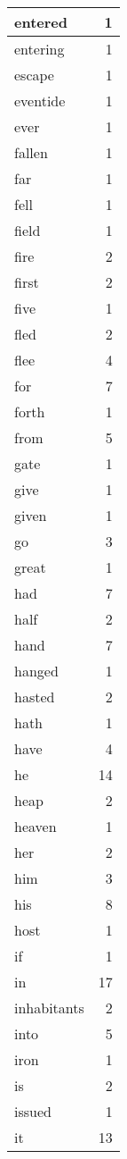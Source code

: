 \begin{center}
\begin{longtable}{l|r}
entered & 1\\ \hline 
entering & 1\\ \hline 
escape & 1\\ \hline 
eventide & 1\\ \hline 
ever & 1\\ \hline 
fallen & 1\\ \hline 
far & 1\\ \hline 
fell & 1\\ \hline 
field & 1\\ \hline 
fire & 2\\ \hline 
first & 2\\ \hline 
five & 1\\ \hline 
fled & 2\\ \hline 
flee & 4\\ \hline 
for & 7\\ \hline 
forth & 1\\ \hline 
from & 5\\ \hline 
gate & 1\\ \hline 
give & 1\\ \hline 
given & 1\\ \hline 
go & 3\\ \hline 
great & 1\\ \hline 
had & 7\\ \hline 
half & 2\\ \hline 
hand & 7\\ \hline 
hanged & 1\\ \hline 
hasted & 2\\ \hline 
hath & 1\\ \hline 
have & 4\\ \hline 
he & 14\\ \hline 
heap & 2\\ \hline 
heaven & 1\\ \hline 
her & 2\\ \hline 
him & 3\\ \hline 
his & 8\\ \hline 
host & 1\\ \hline 
if & 1\\ \hline 
in & 17\\ \hline 
inhabitants & 2\\ \hline 
into & 5\\ \hline 
iron & 1\\ \hline 
is & 2\\ \hline 
issued & 1\\ \hline 
it & 13\\ \hline 

\end{longtable}
\end{center}

